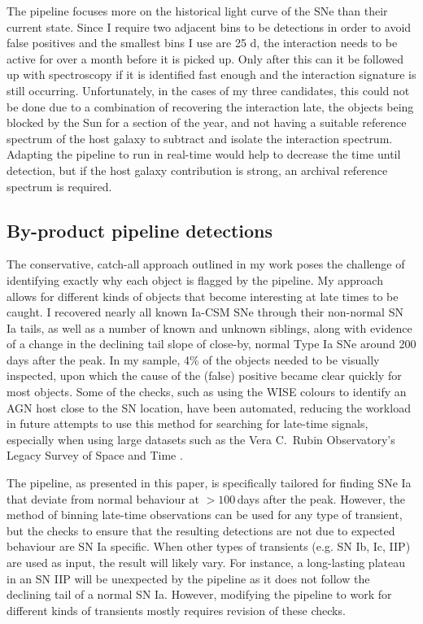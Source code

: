 \documentclass[a4paper,oneside,12pt, class=Latex/Classes/PhDthesisPSnPDF, crop=false]{standalone}
\begin{document}
The pipeline focuses more on the historical light curve of the SNe than their current state. Since I require two adjacent bins to be detections in order to avoid false positives and the smallest bins I use are 25 d, the interaction needs to be active for over a month before it is picked up. Only after this can it be followed up with spectroscopy if it is identified fast enough and the interaction signature is still occurring. Unfortunately, in the cases of my three candidates, this could not be done due to a combination of recovering the interaction late, the objects being blocked by the Sun for a section of the year, and not having a suitable reference spectrum of the host galaxy to subtract and isolate the interaction spectrum. Adapting the pipeline to run in real-time would help to decrease the time until detection, but if the host galaxy contribution is strong, an archival reference spectrum is required.


\subsection{By-product pipeline detections}
The conservative, catch-all approach outlined in my work poses the challenge of identifying exactly why each object is flagged by the pipeline. My approach allows for different kinds of objects that become interesting at late times to be caught. I recovered nearly all known Ia-CSM SNe through their non-normal SN Ia tails, as well as a number of known and unknown siblings, along with evidence of a change in the declining tail slope of close-by, normal Type Ia SNe around 200 days after the peak. In my sample, 4\% of the objects needed to be visually inspected, upon which the cause of the (false) positive became clear quickly for most objects. Some of the checks, such as using the WISE colours to identify an AGN host close to the SN location, have been automated, reducing the workload in future attempts to use this method for searching for late-time signals, especially when using large datasets such as the Vera C.~Rubin Observatory's Legacy Survey of Space and Time \cite[LSST;][]{LSST}.

The pipeline, as presented in this paper, is specifically tailored for finding SNe Ia that deviate from normal behaviour at $>100$\,days after the peak. However, the method of binning late-time observations can be used for any type of transient, but the checks to ensure that the resulting detections are not due to expected behaviour are SN Ia specific. When other types of transients (e.g. SN Ib, Ic, IIP) are used as input, the result will likely vary. For instance, a long-lasting plateau in an SN IIP will be unexpected by the pipeline as it does not follow the declining tail of a normal SN Ia. However, modifying the pipeline to work for different kinds of transients mostly requires revision of these checks.
\end{document}

